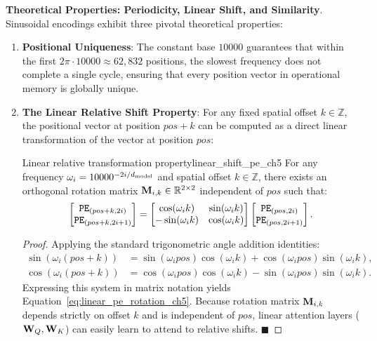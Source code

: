 \documentclass[../../main.tex]{subfiles}
\begin{document}
\noindent\textbf{Theoretical Properties: Periodicity, Linear Shift, and Similarity}.\newline
Sinusoidal encodings exhibit three pivotal theoretical properties:
\begin{enumerate}
    \item \textbf{Positional Uniqueness}: The constant base $10000$ guarantees that within the first $2\pi \cdot 10000 \approx 62{,}832$ positions, the slowest frequency does not complete a single cycle, ensuring that every position vector in operational memory is globally unique.
    \item \textbf{The Linear Relative Shift Property}: For any fixed spatial offset $k \in \mathbb{Z}$, the positional vector at position $pos + k$ can be computed as a direct linear transformation of the vector at position $pos$:
    \begin{theorem}{Linear relative transformation property}{linear_shift_pe_ch5}
    For any frequency $\omega_i = 10000^{-2i/d_{\text{model}}}$ and spatial offset $k \in \mathbb{Z}$, there exists an orthogonal rotation matrix $\mathbf{M}_{i, k} \in \mathbb{R}^{2 \times 2}$ independent of $pos$ such that:
    \begin{equation}
    \label{eq:linear_pe_rotation_ch5}
    \begin{bmatrix} \text{\texttt{PE}}_{(pos+k, 2i)} \\ \text{\texttt{PE}}_{(pos+k, 2i+1)} \end{bmatrix} = \begin{bmatrix} \cos(\omega_i k) & \sin(\omega_i k) \\ -\sin(\omega_i k) & \cos(\omega_i k) \end{bmatrix} \begin{bmatrix} \text{\texttt{PE}}_{(pos, 2i)} \\ \text{\texttt{PE}}_{(pos, 2i+1)} \end{bmatrix}.
    \end{equation}
    \end{theorem}
    \begin{proof}
    Applying the standard trigonometric angle addition identities:
    \begin{align}
    \sin(\omega_i(pos + k)) &= \sin(\omega_i pos)\cos(\omega_i k) + \cos(\omega_i pos)\sin(\omega_i k), \\
    \cos(\omega_i(pos + k)) &= \cos(\omega_i pos)\cos(\omega_i k) - \sin(\omega_i pos)\sin(\omega_i k).
    \end{align}
    Expressing this system in matrix notation yields Equation~\eqref{eq:linear_pe_rotation_ch5}. Because rotation matrix $\mathbf{M}_{i, k}$ depends strictly on offset $k$ and is independent of $pos$, linear attention layers ($\mathbf{W}_Q, \mathbf{W}_K$) can easily learn to attend to relative shifts. $\blacksquare$

\end{proof}
\end{enumerate}
\end{document}
